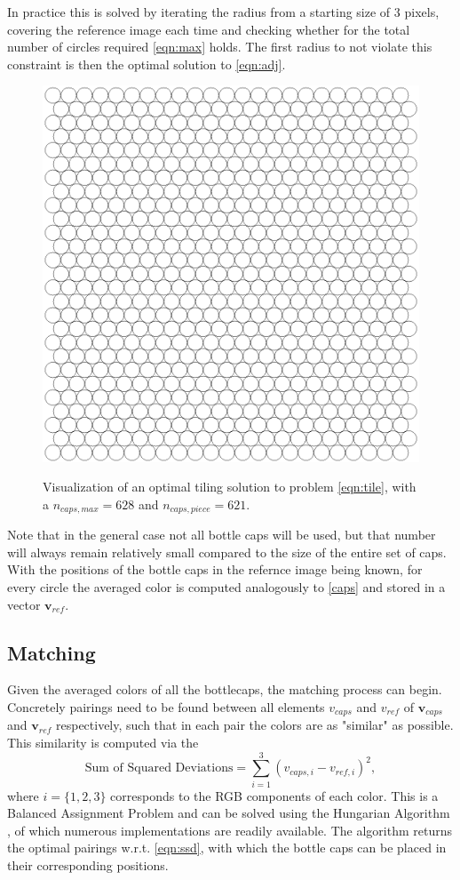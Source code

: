 \documentclass{article}
\begin{document}
In practice this is solved by iterating the radius from a starting size of 3 pixels, covering the reference image each time and checking whether for the total number of circles required \ref{eqn:max} holds. The first radius to not violate this constraint is then the optimal solution to \ref{eqn:adj}.
\begin{figure}[h]
        \begin{center}
        \includegraphics[width=0.4\linewidth]{optimal_tiling.png}
        \label{opttile}
	\caption{Visualization of an optimal tiling solution to problem \ref{eqn:tile}, with a $n_{caps,max} = 628$ and $n_{caps,piece} = 621$.}
\end{center}
\end{figure}
Note that in the general case not all bottle caps will be used, but that number will always remain relatively small compared to the size of the entire set of caps.
With the positions of the bottle caps in the refernce image being known, for every circle the averaged color is computed analogously to \ref{caps} and stored in a vector $\boldsymbol{v}_{ref}$. 
 
\subsection{Matching}
Given the averaged colors of all the bottlecaps, the matching process can begin. Concretely pairings need to be found between all elements $v_{caps}$ and $v_{ref}$ of $\boldsymbol{v}_{caps}$ and $\boldsymbol{v}_{ref}$ respectively, such that in each pair the colors are as "similar" as possible. This similarity is computed via the
\begin{equation}
\label{eqn:ssd}
	\text{Sum of Squared Deviations} = \sum_{i = 1}^{3} (v_{caps,i}-v_{ref,i})^2 ,
\end{equation}
where $i = \{1,2,3\}$ corresponds to the RGB components of each color.
This is a Balanced Assignment Problem and can be solved using the Hungarian Algorithm \cite{https://doi.org/10.1002/nav.3800020109}, of which numerous implementations are readily available. 
The algorithm returns the optimal pairings w.r.t. \ref{eqn:ssd}, with which the bottle caps can be placed in their corresponding positions.
\end{document}

